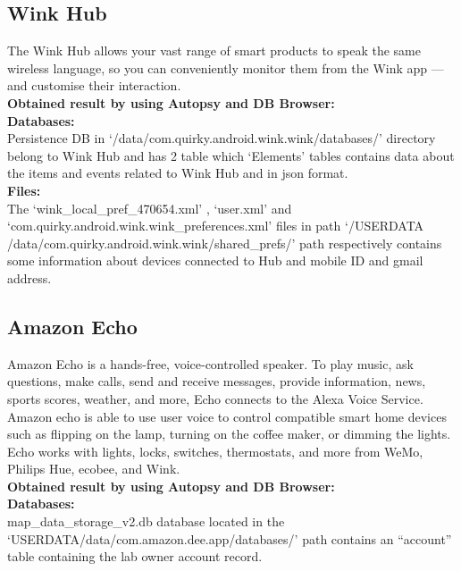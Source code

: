 \documentclass{easychair}
\begin{document}
\subsection{Wink Hub}
The Wink Hub allows your vast range of smart products to speak the same wireless language, so you can conveniently monitor them from the Wink app — and customise their interaction. \cite{pari_7}\\

\textbf{Obtained result by using Autopsy and DB Browser:}\\

\textbf{Databases:}\\
Persistence DB in ‘/data/com.quirky.android.wink.wink/databases/’ directory belong to Wink Hub and has 2 table which ‘Elements’ tables contains data about the items and events related to Wink Hub and in json format.\\

\textbf{Files:}\\
The ‘wink\_local\_pref\_470654.xml’ , ‘user.xml’ and ‘com.quirky.android.wink.wink\_preferences.xml’ files in path ‘/USERDATA /data/com.quirky.android.wink.wink/shared\_prefs/’ path respectively contains some information about devices connected to Hub and mobile ID and gmail address.\\


\subsection{Amazon Echo}

Amazon Echo is a hands-free, voice-controlled speaker. To play music, ask questions, make calls, send and receive messages, provide information, news, sports scores, weather, and more, Echo connects to the Alexa Voice Service. Amazon echo is able to use user voice to control compatible smart home devices  such as flipping on the lamp, turning on the coffee maker, or dimming the lights. Echo works with lights, locks, switches, thermostats, and more from WeMo, Philips Hue, ecobee, and Wink.\cite{pari_8}\\

\textbf{Obtained result by using Autopsy and DB Browser:}\\

\textbf{Databases:}\\
map\_data\_storage\_v2.db database located in the ‘USERDATA/data/com.amazon.dee.app/databases/’ path contains an “account” table containing the lab owner account record.\\
\end{document}
